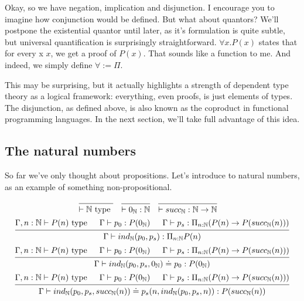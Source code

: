 \documentclass[a4paper, 12pt]{article}
\newcommand{\N}{\mathbb{N}}
\theoremstyle{changedot}
\theoremstyle{changedotbreak}
\theoremstyle{nonumberplain}
\begin{document}
Okay, so we have negation, implication and disjunction. I encourage you to imagine how conjunction would be defined. But what about quantors? We'll postpone the existential quantor until later, as it's formulation is quite subtle, but universal quantification is surprisingly straightforward. $\forall x. P(x)$ states that for every x $x$, we get a proof of $P(x)$. That sounds like a function to me. And indeed, we simply define $\forall := \Pi$. 

This may be surprising, but it actually highlights a strength of dependent type theory as a logical framework: everything, even proofs, is just elements of types. The disjunction, as defined above, is also known as the coproduct in functional programming languages. In the next section, we'll take full advantage of this idea.

\subsection{The natural numbers}
So far we've only thought about propositions. Let's introduce to natural numbers, as an example of something non-propositional.

\begin{align*}
 &\begin{prooftree}
    \infer0{\vdash \N \text{ type }}
  \end{prooftree}
   &
  &\begin{prooftree}
    \infer0{\vdash 0_{\N} : \N}
    \end{prooftree}
    &
    &\begin{prooftree}
      \infer0{\vdash succ_{\N} : \N \to \N}
    \end{prooftree}
\end{align*}
\begin{align*}
  \begin{prooftree}
    \hypo{\Gamma, n : \N \vdash P(n) \text{ type}}
    \hypo{\Gamma \vdash p_{0} : P(0_{\N})}
    \hypo{\Gamma \vdash p_{s} : \Pi_{n:\N} (P(n) \to P(succ_{\N}(n)))}
    \infer3{\Gamma \vdash ind_{\N}(p_{0}, p_{s}) : \Pi_{n:\N} P(n)}
  \end{prooftree}
\end{align*}
\begin{align*}
  \begin{prooftree}
      \hypo{\Gamma, n : \N \vdash P(n) \text{ type}}
      \hypo{\Gamma \vdash p_{0} : P(0_{\N})}
      \hypo{\Gamma \vdash p_{s} : \Pi_{n:\N} (P(n) \to P(succ_{\N}(n)))}
      \infer3{\Gamma \vdash ind_{\N}(p_{0}, p_{s}, 0_{\N}) \doteq p_{0} : P(0_{\N})}
  \end{prooftree}
\end{align*}
\begin{align*}
  \begin{prooftree}
      \hypo{\Gamma, n : \N \vdash P(n) \text{ type}}
      \hypo{\Gamma \vdash p_{0} : P(0_{\N})}
      \hypo{\Gamma \vdash p_{s} : \Pi_{n:\N} (P(n) \to P(succ_{\N}(n)))}
      \infer3{\Gamma \vdash ind_{\N}(p_{0}, p_{s}, succ_{\N}(n)) \doteq p_{s}(n, ind_{\N}(p_{0}, p_{s}, n)) : P(succ_{\N}(n))}
  \end{prooftree}
\end{align*}
\end{document}
